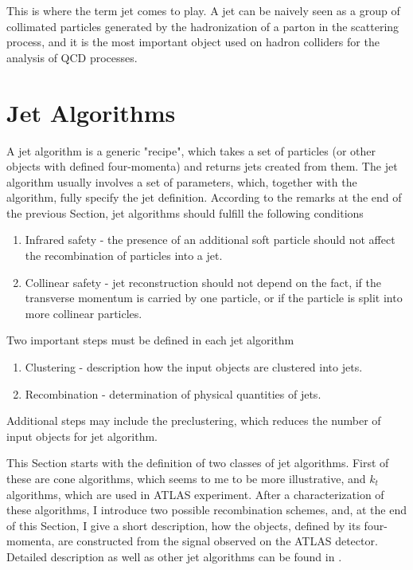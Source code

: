 This is where the term jet comes to play. A jet can be naively seen as a group
of collimated particles generated by the hadronization of a parton in the
scattering process, and it is the most important object used on hadron colliders
for the analysis of QCD processes.

\section{Jet Algorithms}

A jet algorithm is a generic "recipe", which takes a set of particles (or other
objects with defined four-momenta) and returns jets created from them. The jet
algorithm usually involves a set of parameters, which, together with the
algorithm, fully specify the jet definition. According to the remarks at the end
of the previous Section, jet algorithms should fulfill the following conditions 

\begin{enumerate}
  \item Infrared safety - the presence of an additional soft particle should not
    affect the recombination of particles into a jet.
  \item Collinear safety - jet reconstruction should not depend on the fact, if
    the transverse momentum is carried by one particle, or if the particle is split
    into more collinear particles.
\end{enumerate}
Two important steps must be defined in each jet algorithm

\begin{enumerate}
  \item Clustering - description how the input objects are clustered into jets.
  \item Recombination - determination of physical quantities of jets.
\end{enumerate}
Additional steps may include the preclustering, which reduces the number of input
objects for jet algorithm.

This Section starts with the definition of two classes of jet algorithms.
First of these are cone algorithms, which seems to me to be more
illustrative, and $k_t$ algorithms, which are used in ATLAS experiment. After
a characterization of these algorithms, I introduce two possible recombination
schemes, and, at the end of this Section, I give a short description, how the
objects, defined by its four-momenta, are constructed from the signal
observed on the ATLAS detector. Detailed description as well as other jet
algorithms can be found in \cite{ATLASmain,JetDoporuceniZdenek}.

